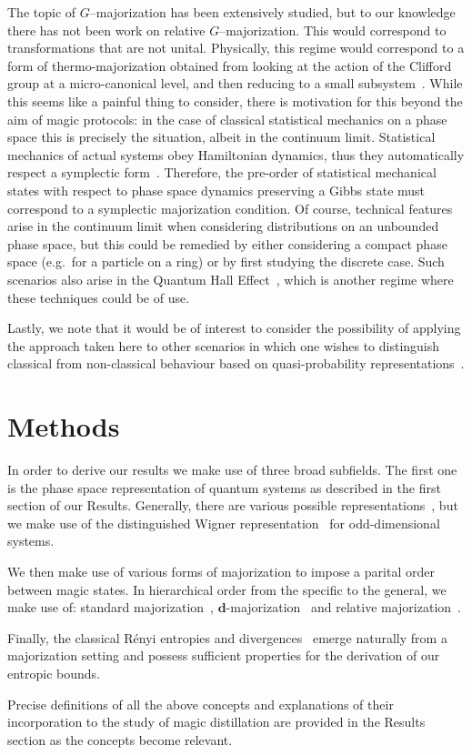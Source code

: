 \documentclass[
onecolumn,
superscriptaddress
]{revtex4-1}
\newcommand{\revhigh}[1]{{\color{red}#1}}
\def\d{\boldsymbol{d}}
\begin{document}
The topic of $G$--majorization has been extensively studied, but to our knowledge there has not been work on relative $G$--majorization. This would correspond to transformations that are not unital. Physically, this regime would correspond to a form of thermo-majorization obtained from looking at the action of the Clifford group at a micro-canonical level, and then reducing to a small subsystem~\cite{Pathria_1997}. While this seems like a painful thing to consider, there is motivation for this beyond the aim of magic protocols: in the case of classical statistical mechanics on a phase space this is precisely the situation, albeit in the continuum limit. Statistical mechanics of actual systems obey Hamiltonian dynamics, thus they automatically respect a symplectic form~\cite{Arnold_2000, Pathria_1997}. Therefore, the pre-order of statistical mechanical states with respect to phase space dynamics preserving a Gibbs state must correspond to a symplectic majorization condition. Of course, technical features arise in the continuum limit when considering distributions on an unbounded phase space, but this could be remedied by either considering a compact phase space (e.g.~for a particle on a ring) or by first studying the discrete case. Such scenarios also arise in the Quantum Hall Effect~\cite{Klitzing_1980}, which is another regime where these techniques could be of use.

Lastly, we note that it would be of interest to consider the possibility of applying the approach taken here to other scenarios in which one wishes to distinguish classical from non-classical behaviour based on quasi-probability representations~\cite{Ferrie_2008, barnett_1997,Allahverdyan_2018, arvidsson_2020, halpern_2018, Lostaglio_2018, Levy_2020}.

\revhigh{
\section*{Methods}

In order to derive our results we make use of three broad subfields.
The first one is the phase space representation of quantum systems as described in the first section of our Results.
Generally, there are various possible representations~\cite{Ferrie_2008}, but we make use of the distinguished Wigner representation~\cite{Gross2006} for odd-dimensional systems.

We then make use of various forms of majorization to impose a parital order between magic states.
In hierarchical order from the specific to the general, we make use of: standard majorization~\cite{cit:marshall}, $\d$-majorization~\cite{Veinott_1971} and relative majorization~\cite{Ruch_1976}.

Finally, the classical R\'{e}nyi entropies and divergences~\cite{renyi_1960} emerge naturally from a majorization setting and possess sufficient properties for the derivation of our entropic bounds.

Precise definitions of all the above concepts and explanations of their incorporation to the study of magic distillation are provided in the Results section as the concepts become relevant.
}
\end{document}
